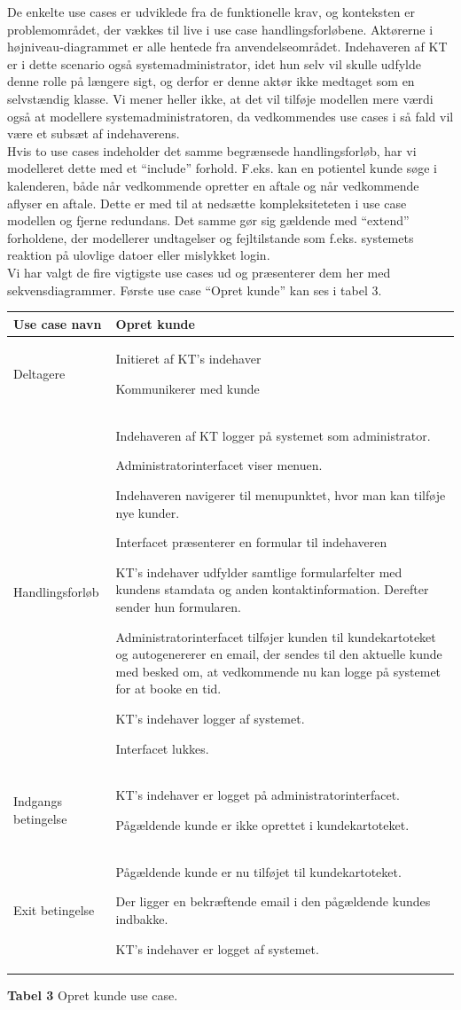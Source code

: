 \documentclass[12pt]{article}   %
\newcommand{\nextitem}{\par\hspace*{\labelsep}\textbullet\hspace*{\labelsep}}
\begin{document}
De enkelte use cases er udviklede fra de funktionelle krav, og konteksten er
problemområdet, der vækkes til live i use case handlingsforløbene. 
Aktørerne i højniveau-diagrammet er alle hentede fra anvendelseområdet.
Indehaveren af KT er i dette scenario også systemadministrator, idet hun selv vil
skulle udfylde denne rolle på længere sigt, og derfor er denne aktør ikke
medtaget som en selvstændig klasse. Vi mener heller ikke, at det vil tilføje
modellen mere værdi også at modellere systemadministratoren, da vedkommendes
use cases i så fald vil være et subsæt af indehaverens.\\
Hvis to use cases indeholder det samme begrænsede handlingsforløb, har vi modelleret
dette med et ``include'' forhold. F.eks. kan en potientel kunde søge i kalenderen,
både når vedkommende opretter en aftale og når vedkommende aflyser en aftale. Dette
er med til at nedsætte kompleksiteteten i use case modellen og fjerne
redundans. Det samme gør sig gældende med ``extend'' forholdene, der
modellerer undtagelser og fejltilstande som f.eks. systemets reaktion på
ulovlige datoer eller mislykket login.\\
Vi har valgt de fire vigtigste use cases ud og præsenterer dem her med 
sekvensdiagrammer. Første use case ``Opret kunde'' kan ses i tabel 3.\\

\begin{tabular}{l p{10cm}}
Use case navn & Opret kunde \\ \hline
Deltagere & \nextitem Initieret af KT's indehaver
            \nextitem Kommunikerer med kunde \\ \hline
Handlingsforløb &
	\nextitem Indehaveren af KT logger på systemet som administrator. 
	\nextitem Administratorinterfacet viser menuen.
	\nextitem Indehaveren navigerer til menupunktet, hvor man kan tilføje nye
		kunder.
		\nextitem Interfacet præsenterer en formular til indehaveren
	\nextitem KT's indehaver udfylder samtlige formularfelter med
		kundens stamdata og anden kontaktinformation. Derefter
		sender hun formularen.		
	\nextitem Administratorinterfacet tilføjer kunden til kundekartoteket
	og autogenererer en email, der sendes til den aktuelle kunde
		med besked om, at vedkommende nu kan logge på systemet for at
		booke en tid.
	\nextitem KT's indehaver logger af systemet. 
	\nextitem Interfacet lukkes.
	\\ \hline
	Indgangs betingelse &
		\nextitem KT's indehaver er logget på administratorinterfacet. 
		\nextitem Pågældende kunde er ikke oprettet i kundekartoteket. 
		\\ \hline
Exit betingelse & 
	\nextitem Pågældende kunde er nu tilføjet til
			kundekartoteket.
		\nextitem Der ligger en bekræftende email i den pågældende kundes
			indbakke.
		\nextitem KT's indehaver er logget af systemet.\\ \hline
\end{tabular}
\begin{center}
\textbf{Tabel 3} Opret kunde use case.
\end{center}
\vspace{0.5cm}
\end{document}
